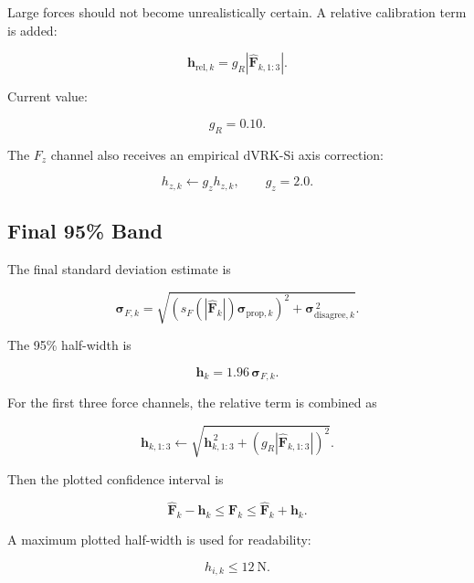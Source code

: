 \documentclass[11pt]{article}
\newcommand{\Fhat}{\hat{\bm F}}
\begin{document}
Large forces should not become unrealistically certain. A relative calibration
term is added:

\begin{equation}
\bm h_{\mathrm{rel},k}
= g_R |\Fhat_{k,1:3}|.
\end{equation}

Current value:

\begin{equation}
g_R = 0.10.
\end{equation}

The \(F_z\) channel also receives an empirical dVRK-Si axis correction:

\begin{equation}
h_{z,k} \leftarrow g_z h_{z,k},
\qquad
g_z = 2.0.
\end{equation}

\subsection{Final 95\% Band}

The final standard deviation estimate is

\begin{equation}
\bm \sigma_{F,k}
=
\sqrt{
\left(s_F(|\Fhat_k|)\bm\sigma_{\mathrm{prop},k}\right)^2
+
\bm\sigma_{\mathrm{disagree},k}^{\,2}
}.
\end{equation}

The 95\% half-width is

\begin{equation}
\bm h_k
= 1.96\,\bm\sigma_{F,k}.
\end{equation}

For the first three force channels, the relative term is combined as

\begin{equation}
\bm h_{k,1:3}
\leftarrow
\sqrt{
\bm h_{k,1:3}^{\,2}
+
\left(g_R|\Fhat_{k,1:3}|\right)^2
}.
\end{equation}

Then the plotted confidence interval is

\begin{equation}
\Fhat_k - \bm h_k
\leq
\bm F_k
\leq
\Fhat_k + \bm h_k.
\end{equation}

A maximum plotted half-width is used for readability:

\begin{equation}
h_{i,k} \leq 12~\mathrm{N}.
\end{equation}
\end{document}
